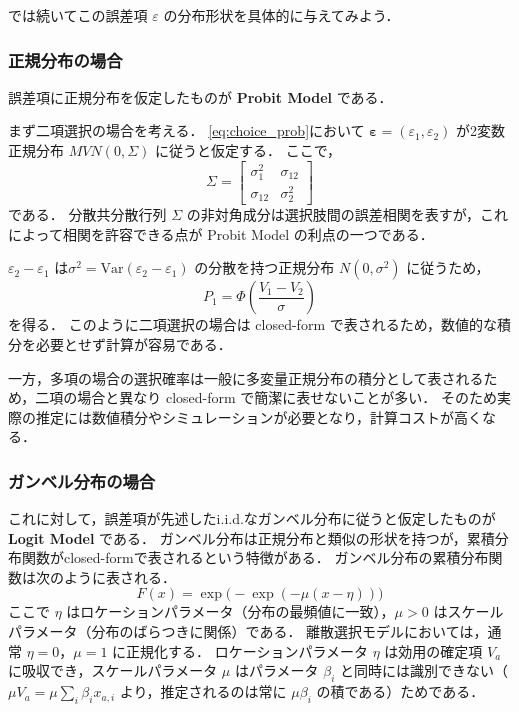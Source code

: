 では続いてこの誤差項 $\varepsilon$ の分布形状を具体的に与えてみよう．

\subsubsection{正規分布の場合}
誤差項に正規分布を仮定したものが \textbf{Probit Model} である．

まず二項選択の場合を考える．
\eqref{eq:choice_prob}において $\bm{\varepsilon}=(\varepsilon_1,\varepsilon_2)$ が2変数正規分布 $MVN(0, \Sigma)$ に従うと仮定する．
ここで，
\begin{equation}
  \Sigma = \begin{bmatrix}
    \sigma_1^2 & \sigma_{12} \\
    \sigma_{12} & \sigma_2^2
  \end{bmatrix}
\end{equation}
である．
分散共分散行列 $\Sigma$ の非対角成分は選択肢間の誤差相関を表すが，これによって相関を許容できる点が Probit Model の利点の一つである．

$\varepsilon_2-\varepsilon_1$ は$\sigma^2=\mathrm{Var}(\varepsilon_2-\varepsilon_1)$ の分散を持つ正規分布 $N(0,\sigma^2)$ に従うため，
\begin{equation}
  P_1 = \Phi\!\left(\frac{V_1-V_2}{\sigma}\right)
\end{equation}
を得る．
このように二項選択の場合は closed-form で表されるため，数値的な積分を必要とせず計算が容易である．

一方，多項の場合の選択確率は一般に多変量正規分布の積分として表されるため，二項の場合と異なり closed-form で簡潔に表せないことが多い．
そのため実際の推定には数値積分やシミュレーションが必要となり，計算コストが高くなる．

\subsubsection{ガンベル分布の場合}
これに対して，誤差項が先述したi.i.d.なガンベル分布に従うと仮定したものが\textbf{Logit Model} である．
ガンベル分布は正規分布と類似の形状を持つが，累積分布関数がclosed-formで表されるという特徴がある．
ガンベル分布の累積分布関数は次のように表される．
\begin{equation}\label{eq:gumbel_cdf}
  F(x) = \exp\bigl(-\exp(-\mu (x - \eta))\bigr)
\end{equation}
ここで $\eta$ はロケーションパラメータ（分布の最頻値に一致），$\mu > 0$ はスケールパラメータ（分布のばらつきに関係）である．
離散選択モデルにおいては，通常 $\eta = 0$，$\mu = 1$ に正規化する．
ロケーションパラメータ $\eta$ は効用の確定項 $V_a$ に吸収でき，スケールパラメータ $\mu$ はパラメータ $\beta_i$ と同時には識別できない（$\mu V_a = \mu \sum_i \beta_i x_{a,i}$ より，推定されるのは常に $\mu \beta_i$ の積である）ためである．

